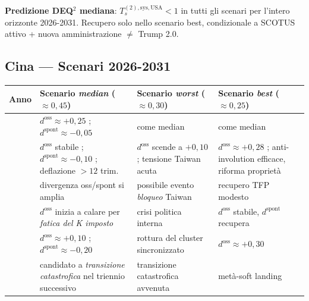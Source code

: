 \Conj{} \textbf{Predizione DEQ$^2$ mediana}:
\(T_s^{(2),\text{sys},\text{USA}} < 1\) in tutti gli scenari per
l'intero orizzonte 2026-2031. Recupero solo nello scenario best,
condizionale a SCOTUS attivo + nuova amministrazione \(\neq\) Trump 2.0.

\subsection{Cina --- Scenari 2026-2031}\label{cina-scenari-2026-2031}

{\def\LTcaptype{none} %
{\small\begin{longtable}[]{@{}
  >{\raggedright\arraybackslash}p{}
  >{\raggedright\arraybackslash}p{}
  >{\raggedright\arraybackslash}p{}
  >{\raggedright\arraybackslash}p{}@{}}
\toprule\noalign{}
\begin{minipage}[b]{\linewidth}\raggedright
Anno
\end{minipage} & \begin{minipage}[b]{\linewidth}\raggedright
Scenario \emph{median} (\(\approx 0{,}45\))
\end{minipage} & \begin{minipage}[b]{\linewidth}\raggedright
Scenario \emph{worst} (\(\approx 0{,}30\))
\end{minipage} & \begin{minipage}[b]{\linewidth}\raggedright
Scenario \emph{best} (\(\approx 0{,}25\))
\end{minipage} \\
\midrule\noalign{}
\endhead
\bottomrule\noalign{}
\endlastfoot
2026 & \(d^{\text{oss}} \approx +0{,}25\) ;
\(d^{\text{spont}} \approx -0{,}05\) & come median & come median \\
2027 & \(d^{\text{oss}}\) stabile ; \(d^{\text{spont}} \approx -0{,}10\)
; deflazione \(> 12\) trim. & \(d^{\text{oss}}\) scende a \(+0{,}10\) ;
tensione Taiwan acuta & \(d^{\text{oss}} \approx +0{,}28\) ;
anti-involution efficace, riforma proprietà \\
2028 & divergenza oss/spont si amplia & possibile evento \emph{bloqueo}
Taiwan & recupero TFP modesto \\
2029 & \(d^{\text{oss}}\) inizia a calare per \emph{fatica del K
imposto} & crisi politica interna & \(d^{\text{oss}}\) stabile,
\(d^{\text{spont}}\) recupera \\
2030 & \(d^{\text{oss}} \approx +0{,}10\) ;
\(d^{\text{spont}} \approx -0{,}20\) & rottura del cluster sincronizzato
& \(d^{\text{oss}} \approx +0{,}30\) \\
2031 & candidato a \emph{transizione catastrofica} nel triennio
successivo & transizione catastrofica avvenuta & metà-soft landing \\
\end{longtable}}
}

